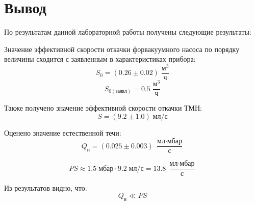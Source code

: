 \documentclass[12pt,a4paper]{article}
\begin{document}
	\section*{Вывод}
	
	По результатам данной лабораторной работы получены следующие результаты:
	
	Значение эффективной скорости откачки форвакуумного насоса по порядку величины сходится с заявленным в характеристиках прибора:
	$$S_0 = (0.26 \pm 0.02) \; \frac{\text{м}^3}{\text{ч}}$$
	$$S_{0(\text{заявл})} = 0.5 \; \frac{\text{м}^3}{\text{ч}}$$
	
	Также получено значение эффективной скорости откачки ТМН:
	$$S = (9.2 \pm 1.0) \; \text{мл}/\text{с}$$
	
	Оценено значение естественной течи:
	$$Q_{\text{н}} = (0.025 \pm 0.003) \; \frac{\text{мл}\cdot\text{мбар}}{\text{с}}$$
	
	$$P S \approx 1.5 \; \text{мбар} \cdot 9.2 \; \text{мл}/\text{с} = 13.8 \; \frac{\text{мл}\cdot\text{мбар}}{\text{с}}$$
	
	Из результатов видно, что:
	$$ Q_{\text{н}} \ll PS $$
	
\end{document}

